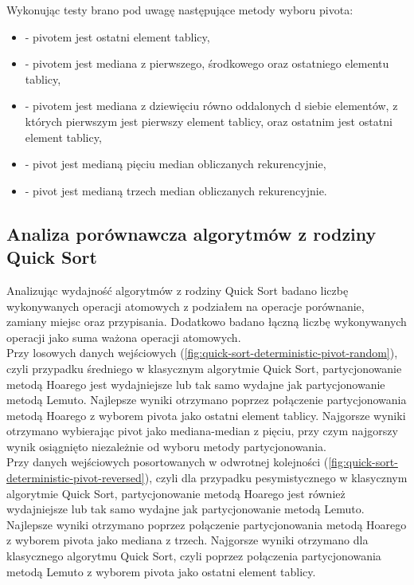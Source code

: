Wykonując testy brano pod uwagę następujące metody wyboru pivota:
\begin{itemize}
	\setlength\itemsep{0em}
	\item {} - pivotem jest ostatni element tablicy,
	\item {} - pivotem jest mediana z pierwszego, środkowego oraz ostatniego elementu tablicy,
	\item {} - pivotem jest mediana z dziewięciu równo oddalonych d siebie elementów, z których pierwszym jest pierwszy element tablicy, oraz ostatnim jest ostatni element tablicy,
	\item {} - pivot jest medianą pięciu median obliczanych rekurencyjnie,
	\item {} - pivot jest medianą trzech median obliczanych rekurencyjnie.\\
\end{itemize}

\subsection{Analiza porównawcza algorytmów z rodziny Quick Sort}

Analizując wydajność algorytmów z rodziny Quick Sort badano liczbę wykonywanych operacji atomowych z podziałem na operacje porównanie, zamiany miejsc oraz przypisania. Dodatkowo badano łączną liczbę wykonywanych operacji jako suma ważona operacji atomowych.\\

Przy losowych danych wejściowych (\ref{fig:quick-sort-deterministic-pivot-random}), czyli przypadku średniego w klasycznym algorytmie Quick Sort, partycjonowanie metodą Hoarego jest wydajniejsze lub tak samo wydajne jak partycjonowanie metodą Lemuto. Najlepsze wyniki otrzymano poprzez połączenie partycjonowania metodą Hoarego z wyborem pivota jako ostatni element tablicy. Najgorsze wyniki otrzymano wybierając pivot jako mediana-median z pięciu, przy czym najgorszy wynik osiągnięto niezależnie od wyboru metody partycjonowania.\\

Przy danych wejściowych posortowanych w odwrotnej kolejności (\ref{fig:quick-sort-deterministic-pivot-reversed}), czyli dla przypadku pesymistycznego w klasycznym algorytmie Quick Sort, partycjonowanie metodą Hoarego jest również wydajniejsze lub tak samo wydajne jak partycjonowanie metodą Lemuto. Najlepsze wyniki otrzymano poprzez połączenie partycjonowania metodą Hoarego z wyborem pivota jako mediana z trzech. Najgorsze wyniki otrzymano dla klasycznego algorytmu Quick Sort, czyli poprzez połączenia partycjonowania metodą Lemuto z wyborem pivota jako ostatni element tablicy.\\

